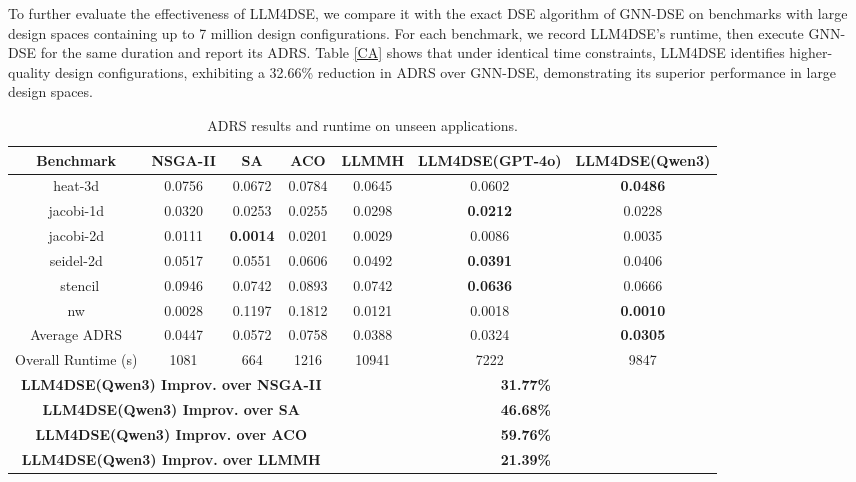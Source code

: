 \documentclass[conference]{IEEEtran}
\begin{document}
	To further evaluate the effectiveness of LLM4DSE, we compare it with the exact DSE algorithm of GNN-DSE \cite{Sohrabizadeh2022} on benchmarks with large design spaces containing up to 7 million design configurations. For each benchmark, we record LLM4DSE’s runtime, then execute GNN-DSE for the same duration and report its ADRS. Table \ref{CA} shows that under identical time constraints, LLM4DSE identifies higher-quality design configurations, exhibiting a 32.66\% reduction in ADRS over GNN-DSE, demonstrating its superior performance in large design spaces.
	
	\begin{table}[t]
		\centering
		\setlength{\tabcolsep}{1pt}
		\tiny
		\caption{ADRS results and runtime on unseen applications.}
		\begin{tabular}{c | c | c | c | c | c | c}
			\toprule
			\bf{Benchmark}&\bf{NSGA-II \cite{Schafer2017}}&\bf{SA \cite{Schafer2009}}&\bf{ACO \cite{Schafer2016}}&\bf{LLMMH \cite{xu2025}}&\bf{LLM4DSE(GPT-4o)}&\bf{LLM4DSE(Qwen3)} \\
			\midrule
			heat-3d & 0.0756 & 0.0672 & 0.0784 & 0.0645 & 0.0602 & \bf{0.0486} \\
			jacobi-1d & 0.0320 & 0.0253 & 0.0255 & 0.0298 & \bf{0.0212} & 0.0228\\
			jacobi-2d & 0.0111 & \bf{0.0014} & 0.0201 & 0.0029 & 0.0086 & 0.0035\\
			seidel-2d & 0.0517 & 0.0551 & 0.0606 & 0.0492 & \bf{0.0391} & 0.0406\\\
			stencil& 0.0946 & 0.0742 & 0.0893 & 0.0742 & \bf{0.0636} & 0.0666 \\
                nw & 0.0028 & 0.1197 & 0.1812 & 0.0121 & 0.0018 & \bf{0.0010} \\
                \hline
			Average ADRS & 0.0447 & 0.0572 & 0.0758 & 0.0388 & 0.0324 & \bf{0.0305}\\
                \hline
			Overall Runtime (s) & 1081& 664 & 1216& 10941 & 7222 & 9847 \\
			\hline
			\multicolumn{4}{c|}{\bf{LLM4DSE(Qwen3) Improv. over NSGA-II}}&\multicolumn{3}{c}{\bf{31.77\%}}\\
			\multicolumn{4}{c|}{\bf{LLM4DSE(Qwen3) Improv. over SA}}&\multicolumn{3}{c}{\bf{46.68\%}}\\
			\multicolumn{4}{c|}{\bf{LLM4DSE(Qwen3) Improv. over ACO}}&\multicolumn{3}{c}{\bf{59.76\%}}\\
			\multicolumn{4}{c|}{\bf{LLM4DSE(Qwen3) Improv. over LLMMH}}&\multicolumn{3}{c}{\bf{21.39\%}}\\
			\bottomrule
		\end{tabular}
		\label{DR}
		\vspace{-3mm}
	\end{table}
	
\end{document}
